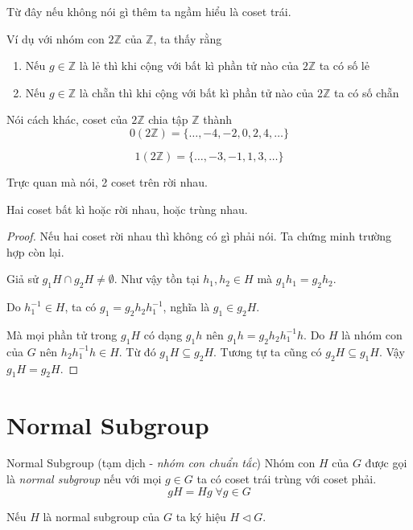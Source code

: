 Từ đây nếu không nói gì thêm ta ngầm hiểu là coset trái.

Ví dụ với nhóm con $2\mathbb{Z}$ của $\mathbb{Z}$, ta thấy rằng

\begin{enumerate}
    \item Nếu $g \in \mathbb{Z}$ là lẻ thì khi cộng với bất kì phần tử nào của $2\mathbb{Z}$ ta có số lẻ
    \item Nếu $g \in \mathbb{Z}$ là chẵn thì khi cộng với bất kì phần tử nào của $2\mathbb{Z}$ ta có số chẵn
\end{enumerate}

Nói cách khác, coset của $2\mathbb{Z}$ chia tập $\mathbb{Z}$ thành
\[0 (2\mathbb{Z}) = \{\ldots, -4, -2, 0, 2, 4, \ldots\}\]
 
\[1 (2\mathbb{Z}) = \{\ldots, -3, -1, 1, 3, \ldots \}\]

Trực quan mà nói, 2 coset trên rời nhau.

\begin{remark}
    Hai coset bất kì hoặc rời nhau, hoặc trùng nhau.
\end{remark}

\begin{proof}
    Nếu hai coset rời nhau thì không có gì phải nói. Ta chứng minh trường hợp còn lại.

    Giả sử $g_1 H \cap g_2 H \neq \emptyset$. Như vậy tồn tại $h_1, h_2 \in H$ mà $g_1 h_1 = g_2 h_2$.

    Do $h_1^{-1} \in H$, ta có $g_1 = g_2 h_2 h_1^{-1}$, nghĩa là $g_1 \in g_2 H$.

    Mà mọi phần tử trong $g_1 H$ có dạng $g_1 h$ nên $g_1 h = g_2 h_2 h_1^{-1} h$. Do $H$ là nhóm con của $G$ nên $h_2 h_1^{-1} h \in H$.
    Từ đó $g_1 H \subseteq g_2 H$. Tương tự ta cũng có $g_2 H \subseteq g_1 H$. Vậy $g_1 H = g_2 H$.
\end{proof}

\section{Normal Subgroup}

\begin{definition}{Normal Subgroup}
    (tạm dịch - \textit{nhóm con chuẩn tắc}) Nhóm con $H$ của $G$ được gọi là \textit{normal subgroup} nếu với mọi $g \in G$ ta có coset trái trùng với coset phải.
    \[gH = Hg \; \forall g \in G\]
\end{definition}

Nếu $H$ là normal subgroup của $G$ ta ký hiệu $H \triangleleft G$.

